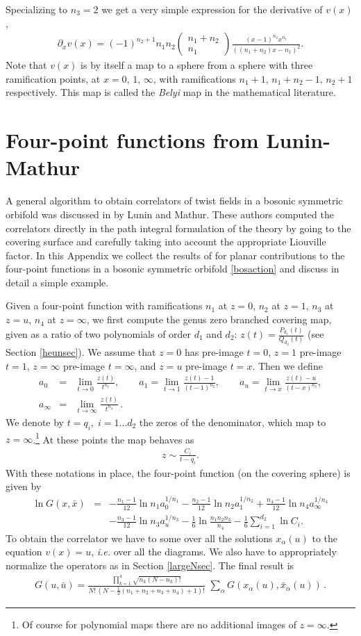 \documentclass[letterpaper]{JHEP3}
\def\d{\partial}
\def\a{\alpha}
\def\half{{\frac12}}
\def\be{\begin{equation}}
\def\ee{\end{equation}}
\def\a{\alpha}
\def\d{{\partial}}
\def\be{\begin{eqnarray}}
\def\ee{\end{eqnarray}}
\def\d{\partial}
\begin{document}
Specializing to $n_3=2$ we get a very simple expression for the derivative of $v(x)$,
\be\label{uofx}
\d_x v(x)=
(-1)^{n_2+1}n_1n_2\left(
\begin{array}{c}
n_1+n_2  \\
n_1
\end{array}
\right)\frac{ (x-1)^{n_2} x^{n_1}}{\left((n_1 + n_2)x-n_1\right)^2}.
\ee
Note that $v(x)$ is by itself a map to a sphere from a sphere with three ramification points, at $x = 0,\,1,\,\infty$,
with ramifications $n_1+1,\,n_1+n_2-1,\, n_2+1$ respectively. This map is called the {\textit{Belyi}} map in
the mathematical literature.

\section{Four-point functions from Lunin-Mathur}\label{luninmathur}
A general algorithm to obtain correlators of twist fields in a bosonic symmetric orbifold was discussed in
\cite{Lunin:2000yv} by Lunin and Mathur. These authors computed the correlators directly in the path integral formulation
of the theory by going to the covering surface and carefully taking into account the appropriate Liouville factor. 
In this Appendix we collect the results of \cite{Lunin:2000yv} for planar contributions to the four-point functions
 in a bosonic symmetric orbifold \eqref{bosaction} and discuss in detail a simple example. 

Given a four-point function with ramifications $n_1$ at $z=0$, $n_2$ at $z=1$, $n_3$ at $z=u$, $n_4$ at $z=\infty$,
we first compute the  genus zero branched  covering map, given as a ratio of two polynomials of order $d_1$ and $d_2$:
 $z(t)=\frac{P_{d_1}(t)}{Q_{d_2}(t)}$ (see Section \ref{heunsec}). We assume that $z=0$ has pre-image  $t=0$,  $z=1$ pre-image $t=1$,
$z=\infty$ pre-image $t=\infty$, and  $z=u$ pre-image $t=x$.
 Then we define
\be
a_0&=&\lim_{t\to 0} \frac{z(t)}{t^{n_1}},\qquad
a_1=\lim_{t\to 1} \frac{z(t)-1}{(t-1)^{n_2}},\qquad
a_u=\lim_{t\to x} \frac{z(t)-u}{(t-x)^{n_3}},\\
a_\infty&=&\lim_{t\to \infty} \frac{z(t)}{t^{n_4}} \, .\nonumber
\ee 
We denote by $t=q_i,\; i=1\dots d_2$ the zeros of the denominator,
which map to $z = \infty$.\footnote{Of course for polynomial maps
 there are no additional images of $z=\infty$.} At these points the  map behaves as
\be
z\sim \frac{C_i}{t-q_i}.
\ee With these notations in place, the
 four-point function (on the covering sphere) is given by %
\be\label{covcorrLM}
\ln G(x,\bar x)&=&-\frac{n_1-1}{12} \ln n_1a_0^{1/n_1} -\frac{n_2-1}{12} \ln n_2a_1^{1/n_2}
 +\frac{n_4-1}{12} \ln n_4a_\infty^{1/n_4}\\&&
-\frac{n_3-1}{12} \ln n_3a_u^{1/n_3}-\frac{1}{6}\ln \frac{{n_1}{n_2}{n_3}}{{n_4}}
-\frac{1}{6}\sum_{i=1}^{d_2}\ln C_i.\nonumber
\ee
To obtain the correlator we have to some over all the solutions $x_\a(u)$ to the equation $v(x)=u$, {\it i.e.} over
all the diagrams. We also have to appropriately normalize the operators as in Section \ref{largeNsec}. The final result is
\be 
G(u,\bar u)= \frac{\prod_{k=1}^4\sqrt{n_k(N-n_k)!}}{N!\,\left(N-\half(n_1+n_2+n_3+n_4)+1\right)!}\,
\,\sum_\a G(x_\a(u),\bar x_\a(u)) \, .
\ee
\end{document}
